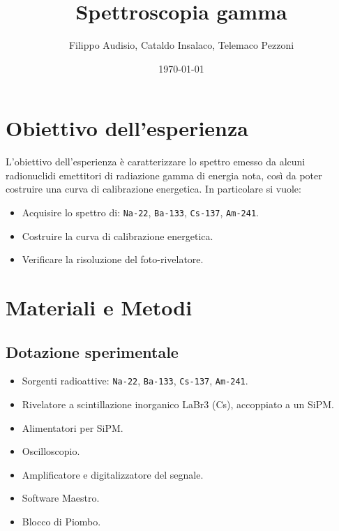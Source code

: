 \documentclass[a4paper,12pt]{article}
\title{\textbf{Spettroscopia gamma}}
\author{Filippo Audisio, Cataldo Insalaco, Telemaco Pezzoni}
\date{\today}
\begin{document}
\maketitle


\section{Obiettivo dell'esperienza}
L'obiettivo dell'esperienza è caratterizzare lo spettro emesso da alcuni radionuclidi emettitori di radiazione gamma di energia nota, così da poter costruire una curva di calibrazione energetica. In particolare si vuole:
\begin{itemize}
    \item Acquisire lo spettro di: \texttt{Na-22}, \texttt{Ba-133}, \texttt{Cs-137}, \texttt{Am-241}.
    \item Costruire la curva di calibrazione energetica.
    \item Verificare la risoluzione del foto-rivelatore.
\end{itemize}

\section{Materiali e Metodi}

\subsection{Dotazione sperimentale}
\begin{itemize}
    \item Sorgenti radioattive: \texttt{Na-22}, \texttt{Ba-133}, \texttt{Cs-137}, \texttt{Am-241}.
    \item Rivelatore a scintillazione inorganico LaBr3 (Cs), accoppiato a un SiPM.
    \item Alimentatori per SiPM.
    \item Oscilloscopio.
    \item Amplificatore e digitalizzatore del segnale.
    \item Software Maestro.
    \item Blocco di Piombo.
\end{itemize}
\end{document}
